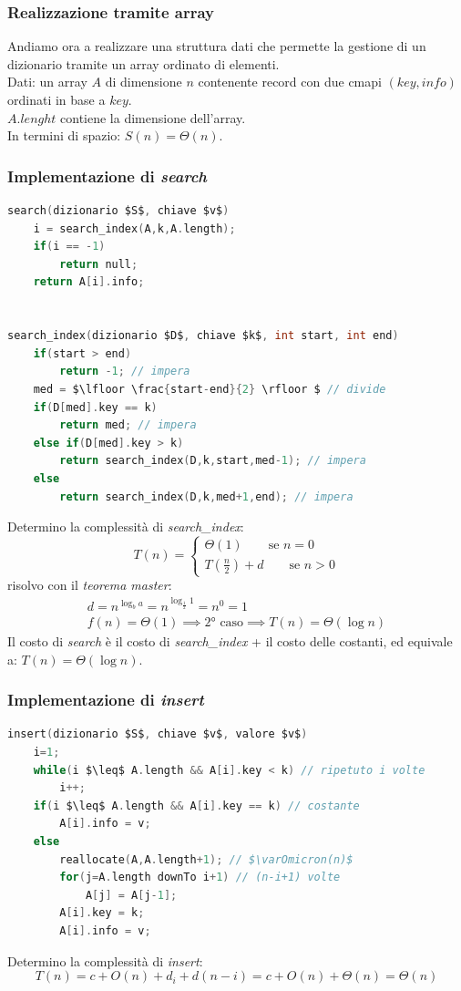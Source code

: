 \documentclass[italian]{article}
\newcommand{\varOmicron}{O}
\newcommand{\fn}{f(n)}
\begin{document}
\subsubsection{Realizzazione tramite array}
Andiamo ora a realizzare una struttura dati che permette la gestione di un dizionario tramite un array ordinato di elementi.\\
Dati: un array $A$ di dimensione $n$ contenente record con due cmapi $(key,info)$ ordinati in base a $key$. \\
$A.lenght$ contiene la dimensione dell'array.\\
In termini di spazio: $S(n) = \varTheta(n)$.
\subsubsection{Implementazione di \textit{search}}
\begin{lstlisting}[language=c,mathescape=true]
search(dizionario $S$, chiave $v$)
	i = search_index(A,k,A.length);
	if(i == -1)
		return null;
	return A[i].info;
	
	
search_index(dizionario $D$, chiave $k$, int start, int end)
	if(start > end)
		return -1; // impera
	med = $\lfloor \frac{start-end}{2} \rfloor $ // divide
	if(D[med].key == k)
		return med; // impera
	else if(D[med].key > k)
		return search_index(D,k,start,med-1); // impera
	else
		return search_index(D,k,med+1,end); // impera
\end{lstlisting}
Determino la complessità di \textit{search\_index}:
\[
	T(n) =
	\begin{cases*}
		\varTheta(1) \qquad \text{se } n=0 \\
		T(\frac{n}{2}) + d \qquad \text{se } n>0
	\end{cases*}
\]
risolvo con il \textit{teorema master}:
\begin{gather*}
	d = n^{\log_b a} = n^{\log_{\frac{1}{2}}1} = n^0 = 1 \\
	\fn = \varTheta(1) \implies \text{2° caso} \implies T(n) = \varTheta(\log n)
\end{gather*}
Il costo di \textit{search} è il costo di \textit{search\_index} + il costo delle costanti, ed equivale a: $T(n) = \varTheta(\log n)$.
\pagebreak
\subsubsection{Implementazione di \textit{insert}}
\begin{lstlisting}[language=c,mathescape=true]
insert(dizionario $S$, chiave $v$, valore $v$)
	i=1;
	while(i $\leq$ A.length && A[i].key < k) // ripetuto i volte
		i++;	
	if(i $\leq$ A.length && A[i].key == k) // costante
		A[i].info = v;
	else
		reallocate(A,A.length+1); // $\varOmicron(n)$
		for(j=A.length downTo i+1) // (n-i+1) volte
			A[j] = A[j-1];
		A[i].key = k;
		A[i].info = v;
\end{lstlisting}
Determino la complessità di \textit{insert}:
\[
	T(n) = c + \varOmicron(n) + d_i + d(n-i) = c + \varOmicron(n) + \varTheta(n) = \varTheta(n)
\]
\end{document}
